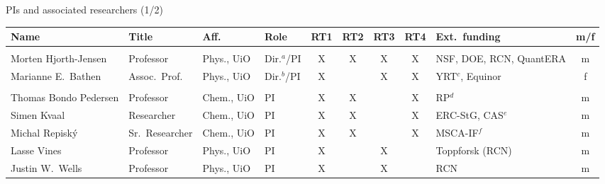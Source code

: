 \documentclass[10pt,aspectratio=169]{beamer}
\begin{document}
\begin{frame}{PIs and associated researchers (1/2)}
\begin{table}[h]
\centering
\scriptsize
\setlength{\tabcolsep}{3.5pt}
\renewcommand{\arraystretch}{1.3}
\begin{tabular}{@{}>{\raggedright\arraybackslash}p{2.7cm}>{\raggedright\arraybackslash}p{1.9cm}llcccc>{\raggedright\arraybackslash}p{2.3cm}c@{}}
\toprule
\textbf{Name} & \textbf{Title} & \textbf{Aff.} & \textbf{Role} & \textbf{RT1} & \textbf{RT2} & \textbf{RT3} & \textbf{RT4} & \textbf{Ext.\ funding} & \textbf{m/f}\\
\midrule
\multicolumn{10}{@{}l}{\textit{Centre directors}}\\
Morten Hjorth-Jensen      & Professor      & Phys., UiO & Dir.$^{a}$/PI & X & X & X  & X & NSF, DOE, RCN, QuantERA          & m\\
Marianne E.\ Bathen       & Assoc.\ Prof.\ & Phys., UiO & Dir.$^{b}$/PI & X &   & X & X & YRT$^{c}$, Equinor     & f\\
\midrule
\multicolumn{10}{@{}l}{\textit{Principal investigators}}\\
Thomas Bondo Pedersen     & Professor      & Chem., UiO & PI            & X & X &   & X & RP$^{d}$               & m\\
Simen Kvaal               & Researcher     & Chem., UiO & PI            & X & X &   & X & ERC-StG, CAS$^{e}$     & m\\
Michal Repisk\'y          & Sr.\ Researcher& Chem., UiO & PI            & X & X &   & X & MSCA-IF$^{f}$          & m\\
Lasse Vines               & Professor      & Phys., UiO & PI            & X &   & X &   & Toppforsk (RCN)        & m\\
Justin W.\ Wells          & Professor      & Phys., UiO & PI            & X &   & X &   & RCN                    & m\\
\bottomrule
\end{tabular}
\end{table}
\end{frame}
\end{document}
